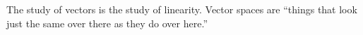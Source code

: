\documentclass[10pt, a4paper, twocolumn]{article}
\begin{document}
The study of vectors is the study of linearity. Vector spaces are “things that look just the same over
there as they do over here.”
\end{document}
